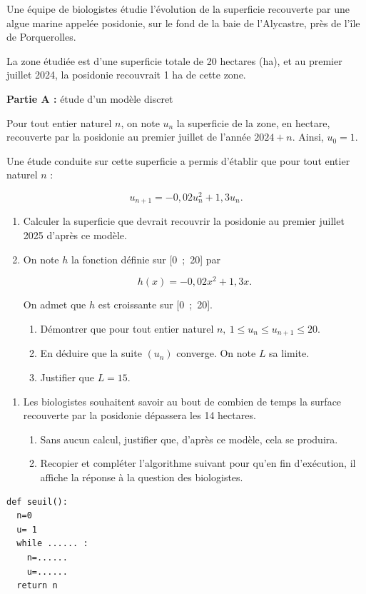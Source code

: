 \medskip

Une équipe de biologistes étudie l'évolution de la superficie recouverte par une algue marine appelée posidonie, sur le fond de la baie de l'Alycastre, près de l'île de Porquerolles.

La zone étudiée est d'une superficie totale de 20 hectares (ha), et au premier juillet 2024, la posidonie recouvrait 1 ha de cette zone.

\begin{center}\textbf{Partie A :} étude d'un modèle discret\end{center}

Pour tout entier naturel $n$, on note $u_n$ la superficie de la zone, en hectare, recouverte
par la posidonie au premier juillet de l'année $2024 + n$. Ainsi, $u_0 = 1$.

\smallskip

Une étude conduite sur cette superficie a permis d'établir que pour tout entier
naturel $n$ :

\[u_{n+1} = - 0,02u_n^2 + 1,3u_n.\]

\smallskip

\begin{enumerate}
\item Calculer la superficie que devrait recouvrir la posidonie au premier juillet 2025 d'après ce modèle.
\item On note $h$ la fonction définie sur [0~;~20] par 

\[h(x) = - 0,02x^2 + 1,3x.\]

On admet que $h$ est croissante sur [0~;~20].
	\begin{enumerate}
		\item Démontrer que pour tout entier naturel $n,\: 1 \leqslant u_n  \leqslant u_{n+1} \leqslant 20$.
		\item En déduire que la suite $\left(u_n\right)$ converge. On note $L$ sa limite.
		\item Justifier que $L = 15$.
	\end{enumerate}
\end{enumerate}
\begin{minipage}{0.65\linewidth}
\begin{enumerate}[resume]
\item Les biologistes souhaitent savoir au bout de combien de temps la surface recouverte par la
posidonie dépassera les 14 hectares.
	\begin{enumerate}
		\item Sans aucun calcul, justifier que, d'après ce modèle, cela se produira.
		\item Recopier et compléter l'algorithme suivant pour qu'en fin d'exécution, il affiche la réponse à la question des biologistes.
	\end{enumerate}
\end{enumerate}
\end{minipage}\hfill
\begin{minipage}{0.3\linewidth}
\begin{Verbatim}[frame=single]
def seuil():
  n=0
  u= 1
  while ...... :
    n=......
    u=......
  return n
\end{Verbatim}
\end{minipage}

